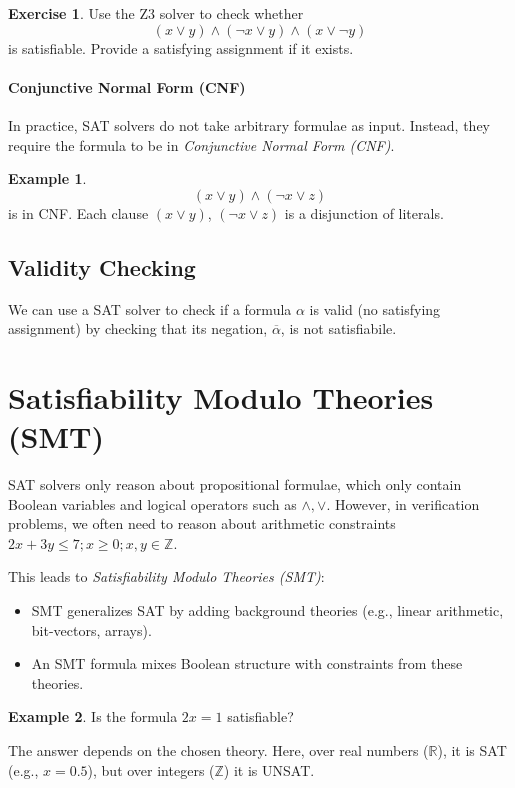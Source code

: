\documentclass[oneside,11pt,dvipsnames]{book}
\numberwithin{equation}{section}
\theoremstyle{definition}
\newtheorem{example}{Example}[section]
\newtheorem{exercise}{Exercise}[section]
\theoremstyle{remark}
\begin{document}
\begin{exercise}
Use the Z3 solver to check whether
\[
(x \lor y) \land (\lnot x \lor y) \land (x \lor \lnot y)
\] is satisfiable.  
Provide a satisfying assignment if it exists.
\end{exercise}




\paragraph{Conjunctive Normal Form (CNF)}
In practice, SAT solvers do not take arbitrary formulae as input. Instead, they require the formula to be in \emph{Conjunctive Normal Form (CNF)}.


\begin{example}
\[
(x \lor y) \land (\lnot x \lor z)
\]
is in CNF. Each clause $(x \lor y)$, $(\lnot x \lor z)$ is a disjunction of literals.
\end{example}



\subsection{Validity Checking}\label{sec:validity-checking}
We can use a SAT solver to check if a formula $\alpha$ is valid (no satisfying assignment) by checking that its negation, $\overline{\alpha}$, is not satisfiabile.



\section{Satisfiability Modulo Theories (SMT)}

SAT solvers only reason about propositional formulae, which only contain Boolean variables and logical operators such as $\land, \lor$.  However, in verification problems, we often need to reason about arithmetic constraints $2x + 3y \leq 7; x \geq 0; x,y \in \mathbb{Z}$.


This leads to \emph{Satisfiability Modulo Theories (SMT)}:
\begin{itemize}
  \item SMT generalizes SAT by adding background theories (e.g., linear arithmetic, bit-vectors, arrays).
  \item An SMT formula mixes Boolean structure with constraints from these theories.
\end{itemize}

\begin{example}\label{ex:smt2}
Is the formula $2x = 1$ satisfiable? 

The answer depends on the chosen theory. Here, over real numbers ($\mathbb{R}$), it is SAT (e.g., $x=0.5$), but over integers ($\mathbb{Z}$) it is UNSAT.


\end{example}
\end{document}

